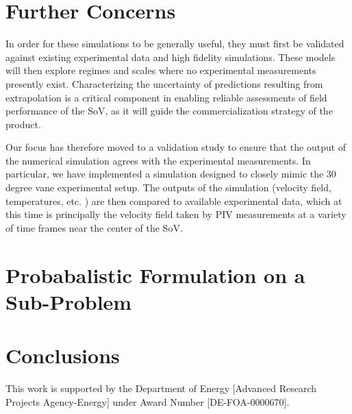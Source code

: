 \documentclass{article}
\begin{document}
%
%
%
\section{Further Concerns}

In order for these simulations to be generally useful, they must first
be validated against existing experimental data and high fidelity
simulations. These models will then explore regimes and scales where no
experimental measurements presently exist. Characterizing the
uncertainty of predictions resulting from extrapolation is a critical
component in enabling reliable assessments of field performance of the
SoV, as it will guide the commercialization strategy of the product.

Our focus has therefore moved to a validation study to ensure that the output of the 
numerical simulation agrees with the experimental measurements. In particular, we have 
implemented a simulation designed to closely mimic the 30 degree vane
experimental setup. The  
outputs of the simulation (velocity field, temperatures, etc. ) are then
compared to available experimental data, which at this time is
principally the velocity field taken by PIV measurements at a variety of
time frames near the center of the SoV.  


%
%
%
\section{Probabalistic Formulation on a Sub-Problem}


%
%
%
\section{Conclusions}




%
%
\newpage
This work is supported by the Department of Energy [Advanced Research
Projects Agency-Energy] under Award Number [DE-FOA-0000670].   
\end{document}
